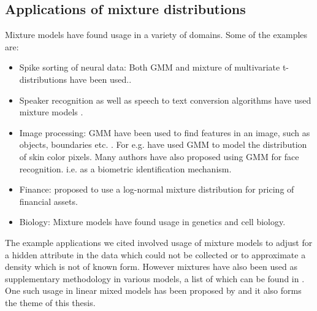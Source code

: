 \subsection{Applications of mixture distributions}
Mixture models have found usage in a variety of domains. Some of the examples are:
\begin{itemize}
\item Spike sorting of neural data: Both GMM and mixture of multivariate t-distributions have been used.\citep{lewicki_bayesian_1994,shoham_robust_2003}.
\item Speaker recognition as well as speech to text conversion algorithms have used mixture models \citep{simancas-acevedo_speaker_2001,xiang_efficient_2003,povey_subspace_2011}.
\item Image processing: GMM have been used to find features in an image, such as objects, boundaries etc. \citep{fu_color_2012}. For e.g. \citet{ming-hsuan_yang_gaussian_1998} have used GMM to model the distribution of skin color pixels. Many authors have also proposed using GMM for face recognition. i.e. as a biometric identification mechanism.
\item Finance: \citet{brigo_lognormal-mixture_2002} proposed to use a log-normal mixture distribution for pricing of financial assets.
\item Biology: Mixture models have found usage in genetics and cell biology.\citep{sim_evaluating_2012,gianola_mixture_2007} 
\end{itemize}

The example applications we cited involved usage of mixture models to adjust for a hidden attribute in the data which could not be collected or to approximate a density which is not of known form. However mixtures have also been used as supplementary methodology in various models, a list of which can be found in \citet[pg. 238]{fruhwirth-schnatter_finite_2013}. One such usage in linear mixed models has been proposed by \citet{verbeke_linear_1996} and it also forms the theme of this thesis.

